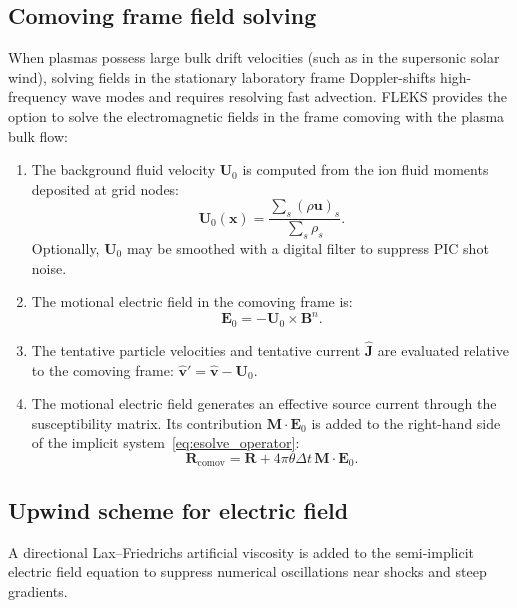 \documentclass[a4paper, 11pt]{article}
\begin{document}
\subsection{Comoving frame field solving}

When plasmas possess large bulk drift velocities (such as in the supersonic solar wind), solving fields in the stationary laboratory frame Doppler-shifts high-frequency wave modes and requires resolving fast advection. FLEKS provides the option to solve the electromagnetic fields in the frame comoving with the plasma bulk flow:

\begin{enumerate}
  \item The background fluid velocity $\mathbf{U}_0$ is computed from the ion fluid moments deposited at grid nodes:
  \begin{equation}
  \mathbf{U}_0(\mathbf{x}) = \frac{\sum_s (\rho \mathbf{u})_s}{\sum_s \rho_s}.
  \end{equation}
  Optionally, $\mathbf{U}_0$ may be smoothed with a digital filter to suppress PIC shot noise.
  \item The motional electric field in the comoving frame is:
  \begin{equation}
  \mathbf{E}_0 = -\mathbf{U}_0 \times \mathbf{B}^n.
  \end{equation}
  \item The tentative particle velocities and tentative current $\hat{\mathbf{J}}$ are evaluated relative to the comoving frame: $\hat{\mathbf{v}}' = \hat{\mathbf{v}} - \mathbf{U}_0$.
  \item The motional electric field generates an effective source current through the susceptibility matrix. Its contribution $\mathbf{M} \cdot \mathbf{E}_0$ is added to the right-hand side of the implicit system~\eqref{eq:esolve_operator}:
  \begin{equation}
  \mathbf{R}_{\text{comov}} = \mathbf{R} + 4\pi \theta \Delta t \, \mathbf{M} \cdot \mathbf{E}_0.
  \end{equation}
\end{enumerate}

\subsection{Upwind scheme for electric field}
\label{sec:upwind_E}

A directional Lax--Friedrichs artificial viscosity is added to the semi-implicit electric field equation to suppress numerical oscillations near shocks and steep gradients.
\end{document}
